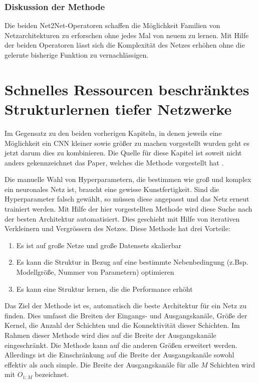 \subsubsection{Diskussion der Methode}

Die beiden Net2Net-Operatoren schaffen die Möglichkeit Familien von Netzarchitekturen zu erforschen ohne jedes Mal von neuem zu lernen. Mit Hilfe der beiden Operatoren lässt sich die Komplexität des Netzes erhöhen ohne die gelernte bisherige Funktion zu vernachlässigen.


\section{Schnelles Ressourcen beschränktes Strukturlernen tiefer Netzwerke}
\color{blue1}
Im Gegensatz zu den beiden vorherigen Kapiteln, in denen jeweils eine Möglichkeit ein CNN kleiner sowie größer zu machen vorgestellt wurden geht es jetzt darum dies zu kombinieren. Die Quelle für diese Kapitel ist soweit nicht anders gekennzeichnet das Paper, welches die Methode vorgestellt hat \cite{morphnet}.

Die manuelle Wahl von Hyperparametern, die bestimmen wie groß und komplex ein neuronales Netz ist, braucht eine gewisse Kunstfertigkeit. Sind die Hyperparameter falsch gewählt, so müssen diese angepasst und das Netz erneut trainiert werden. Mit Hilfe der hier vorgestellten Methode wird diese Suche nach der besten Architektur automatisiert. Dies geschieht mit Hilfe von iterativen Verkleinern und Vergrössern des Netzes. Diese Methode hat drei Vorteile:
\begin{enumerate}
 \item Es ist auf große Netze und große Datensets skalierbar
 \item Es kann die Struktur in Bezug auf eine bestimmte Nebenbedingung (z.Bsp. Modellgröße, Nummer von Parametern) optimieren
 \item Es kann eine Struktur lernen, die die Performance erhöht
\end{enumerate}

Das Ziel der Methode ist es, automatisch die beste Architektur für ein Netz zu finden. Dies umfasst die Breiten der Eingangs- und Ausgangskanäle, Größe der Kernel, die Anzahl der Schichten und die Konnektivität dieser Schichten. Im Rahmen dieser Methode wird dies auf die Breite der Ausgangskanäle eingeschränkt. Die Methode kann auf die anderen Größen erweitert werden. Allerdings ist die Einschränkung auf die Breite der Ausgangskanäle sowohl effektiv als auch simple.
Die Breite der Ausgangskanäle für alle $M$ Schichten wird mit $O_{1:M}$ bezeichnet. 

